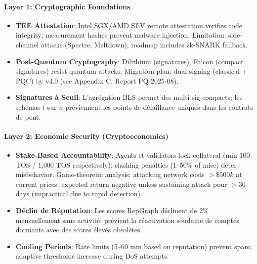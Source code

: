 \documentclass[11pt]{article}
\begin{document}
\paragraph{Layer 1: Cryptographic Foundations}
\begin{itemize}[noitemsep]
  \item \textbf{TEE Attestation}: Intel SGX/AMD SEV remote attestation verifies code integrity; measurement hashes prevent malware injection. Limitation: side-channel attacks (Spectre, Meltdown); roadmap includes zk-SNARK fallback.
  \item \textbf{Post-Quantum Cryptography}: Dilithium (signatures), Falcon (compact signatures) resist quantum attacks. Migration plan: dual-signing (classical + PQC) by v4.0 (see Appendix C, Report PQ-2025-08).
  \item \textbf{Signatures à Seuil}: L'agrégation BLS permet des multi-sig compacts; les schémas $t$-sur-$n$ préviennent les points de défaillance uniques dans les contrats de pont.
\end{itemize}

\paragraph{Layer 2: Economic Security (Cryptoeconomics)}
\begin{itemize}[noitemsep]
  \item \textbf{Stake-Based Accountability}: Agents et validators lock collateral (min 100 TOS / 1,000 TOS respectively); slashing penalties (1--50\% of mise) deter misbehavior. Game-theoretic analysis: attacking network costs $>\$500k$ at current prices; expected return negative unless sustaining attack pour $>30$ days (impractical due to rapid detection).
  \item \textbf{Déclin de Réputation}: Les scores RepGraph déclinent de 2\% mensuellement sans activité; prévient la réactivation soudaine de comptes dormants avec des scores élevés obsolètes.
  \item \textbf{Cooling Periods}: Rate limits (5--60 min based on reputation) prevent spam; adaptive thresholds increase during DoS attempts.
\end{itemize}
\end{document}
